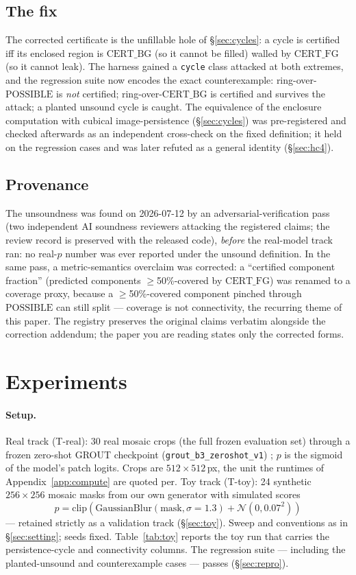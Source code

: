 \documentclass[10pt]{article}
\newcommand{\CFG}{\mathrm{CERT\_FG}}
\newcommand{\CBG}{\mathrm{CERT\_BG}}
\newcommand{\POSS}{\mathrm{POSSIBLE}}
\begin{document}
\subsection{The fix}
The corrected certificate is the unfillable hole of \S\ref{sec:cycles}: a
cycle is certified iff its enclosed region is $\CBG$ (so it cannot be
filled) walled by $\CFG$ (so it cannot leak). The harness gained a
\texttt{cycle} class attacked at both extremes, and the regression suite
now encodes the exact counterexample: ring-over-$\POSS$ is \emph{not}
certified; ring-over-$\CBG$ is certified and survives the attack; a
planted unsound cycle is caught. The equivalence of the enclosure
computation with cubical image-persistence (\S\ref{sec:cycles}) was
pre-registered and checked afterwards as an independent cross-check on the
fixed definition; it held on the regression cases and was later refuted as
a general identity (\S\ref{sec:hc4}).

\subsection{Provenance}
The unsoundness was found on 2026-07-12 by an adversarial-verification
pass (two independent AI soundness reviewers attacking the registered
claims; the review record is preserved with the released code), \emph{before} the
real-model track ran: no real-$p$ number was ever reported under the
unsound definition. In the same pass, a metric-semantics overclaim was
corrected: a ``certified component fraction'' (predicted components
$\ge$50\%-covered by $\CFG$) was renamed to a coverage proxy, because a
$\ge$50\%-covered component pinched through $\POSS$ can still split ---
coverage is not connectivity, the recurring theme of this paper. The
registry preserves the original claims verbatim alongside the correction
addendum; the paper you are reading states only the corrected forms.

\section{Experiments}\label{sec:experiments}

\paragraph{Setup.} Real track (T-real): 30 real mosaic crops (the full
frozen evaluation set) through a frozen zero-shot GROUT
checkpoint (\texttt{grout\_b3\_zeroshot\_v1}) \citep{lovecky2026grout};
$p$ is the sigmoid of the model's patch logits. Crops are
$512\times512$\,px, the unit the runtimes of Appendix~\ref{app:compute}
are quoted per. Toy track (T-toy): 24 synthetic $256\times 256$
mosaic masks from our own generator with simulated scores
\[
  p=\mathrm{clip}\!\left(\mathrm{GaussianBlur}(\text{mask},\sigma{=}1.3)+
  \mathcal{N}(0,0.07^2)\right)
\]
--- retained strictly as a validation track
(\S\ref{sec:toy}). Sweep and conventions as in \S\ref{sec:setting}; seeds
fixed. Table~\ref{tab:toy} reports the toy run that carries the
persistence-cycle and connectivity columns. The
regression suite --- including the planted-unsound and counterexample
cases --- passes (\S\ref{sec:repro}).
\end{document}
